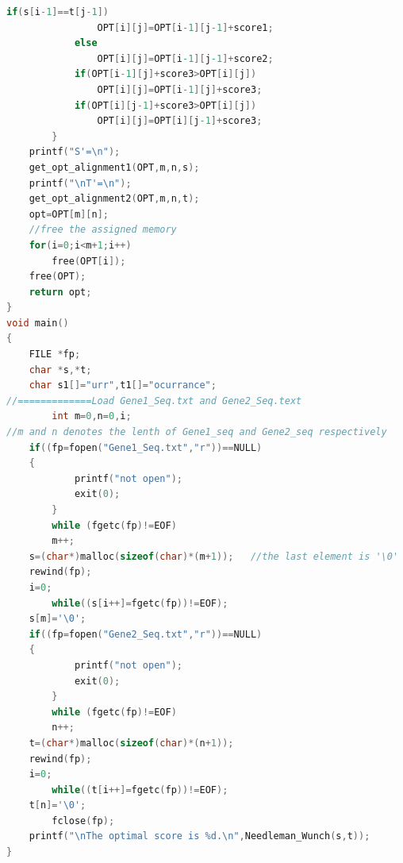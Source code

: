 \documentclass[11pt]{article}
\begin{document}
\begin{CJK}{UTF8}{gkai}
\begin{lstlisting}[language={C}]
			if(s[i-1]==t[j-1])
				OPT[i][j]=OPT[i-1][j-1]+score1;
			else
				OPT[i][j]=OPT[i-1][j-1]+score2;
			if(OPT[i-1][j]+score3>OPT[i][j])
				OPT[i][j]=OPT[i-1][j]+score3;
			if(OPT[i][j-1]+score3>OPT[i][j])
				OPT[i][j]=OPT[i][j-1]+score3;
		}
	printf("S'=\n");
	get_opt_alignment1(OPT,m,n,s);
	printf("\nT'=\n");
	get_opt_alignment2(OPT,m,n,t);
	opt=OPT[m][n];
	//free the assigned memory
	for(i=0;i<m+1;i++)
		free(OPT[i]);
	free(OPT);
	return opt;	
}
void main()
{
	FILE *fp;
	char *s,*t;
	char s1[]="urr",t1[]="ocurrance";
//=============Load Gene1_Seq.txt and Gene2_Seq.text
    	int m=0,n=0,i;
//m and n denotes the lenth of Gene1_seq and Gene2_seq respectively
  	if((fp=fopen("Gene1_Seq.txt","r"))==NULL) 
   	{
       		printf("not open");
        	exit(0);
    	}	
    	while (fgetc(fp)!=EOF) 
		m++;
	s=(char*)malloc(sizeof(char)*(m+1));   //the last element is '\0'
	rewind(fp);   
	i=0;
    	while((s[i++]=fgetc(fp))!=EOF);
	s[m]='\0';
  	if((fp=fopen("Gene2_Seq.txt","r"))==NULL) 
   	{
       		printf("not open");
        	exit(0);
    	}	
    	while (fgetc(fp)!=EOF) 
		n++;
	t=(char*)malloc(sizeof(char)*(n+1));
	rewind(fp);
	i=0;
    	while((t[i++]=fgetc(fp))!=EOF);
	t[n]='\0';
    	fclose(fp);
	printf("\nThe optimal score is %d.\n",Needleman_Wunch(s,t));
}
\end{lstlisting}
\end{CJK}
\end{document}
